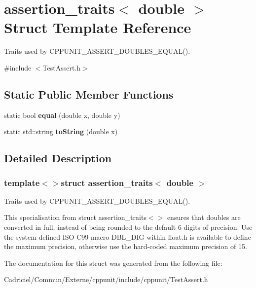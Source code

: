 \hypertarget{structassertion__traits_3_01double_01_4}{\section{assertion\-\_\-traits$<$ double $>$ Struct Template Reference}
\label{structassertion__traits_3_01double_01_4}
}


Traits used by C\-P\-P\-U\-N\-I\-T\-\_\-\-A\-S\-S\-E\-R\-T\-\_\-\-D\-O\-U\-B\-L\-E\-S\-\_\-\-E\-Q\-U\-A\-L().  




{\ttfamily \#include $<$Test\-Assert.\-h$>$}

\subsection*{Static Public Member Functions}
\begin{DoxyCompactItemize}
\item 
\hypertarget{structassertion__traits_3_01double_01_4_ac0d9d71ec0f239664b88188e481c0598}{static bool {\bfseries equal} (double x, double y)}\label{structassertion__traits_3_01double_01_4_ac0d9d71ec0f239664b88188e481c0598}

\item 
\hypertarget{structassertion__traits_3_01double_01_4_a6bc37874eb60d30e0b50d4c127ab34df}{static std\-::string {\bfseries to\-String} (double x)}\label{structassertion__traits_3_01double_01_4_a6bc37874eb60d30e0b50d4c127ab34df}

\end{DoxyCompactItemize}


\subsection{Detailed Description}
\subsubsection*{template$<$$>$struct assertion\-\_\-traits$<$ double $>$}

Traits used by C\-P\-P\-U\-N\-I\-T\-\_\-\-A\-S\-S\-E\-R\-T\-\_\-\-D\-O\-U\-B\-L\-E\-S\-\_\-\-E\-Q\-U\-A\-L(). 

This specialisation from {\ttfamily struct} {\ttfamily assertion\-\_\-traits$<$$>$} ensures that doubles are converted in full, instead of being rounded to the default 6 digits of precision. Use the system defined I\-S\-O C99 macro D\-B\-L\-\_\-\-D\-I\-G within float.\-h is available to define the maximum precision, otherwise use the hard-\/coded maximum precision of 15. 

The documentation for this struct was generated from the following file\-:\begin{DoxyCompactItemize}
\item 
Cadriciel/\-Commun/\-Externe/cppunit/include/cppunit/Test\-Assert.\-h\end{DoxyCompactItemize}
